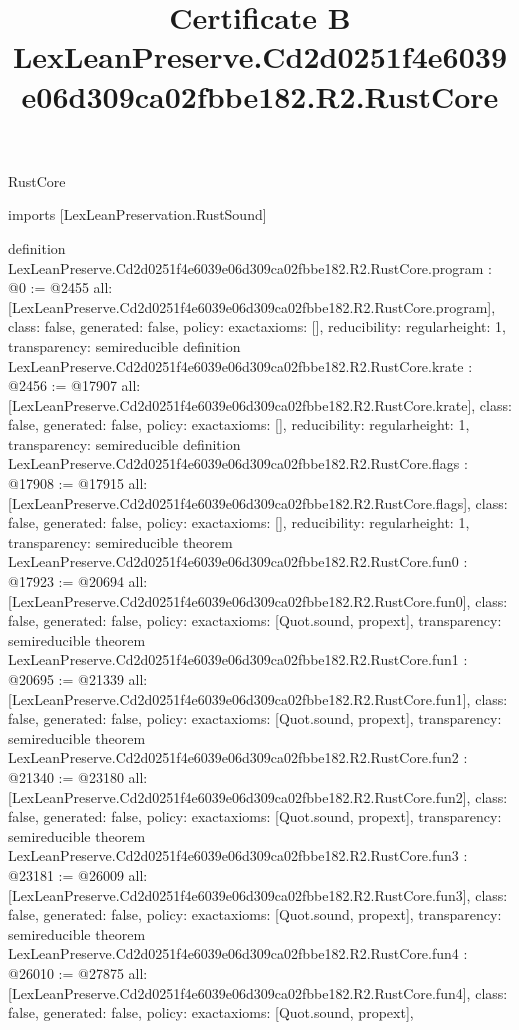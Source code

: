 \begin{lexlean}{RustCore}
\title{Certificate B LexLeanPreserve.Cd2d0251f4e6039e06d309ca02fbbe182.R2.RustCore}
\begin{coremodule}
imports [LexLeanPreservation.RustSound]

definition LexLeanPreserve.Cd2d0251f4e6039e06d309ca02fbbe182.R2.RustCore.program : @0 := @2455 {
  all: [LexLeanPreserve.Cd2d0251f4e6039e06d309ca02fbbe182.R2.RustCore.program],
  class: false,
  generated: false,
  policy: exact{axioms: []},
  reducibility: regular{height: 1},
  transparency: semireducible
}
definition LexLeanPreserve.Cd2d0251f4e6039e06d309ca02fbbe182.R2.RustCore.krate : @2456 := @17907 {
  all: [LexLeanPreserve.Cd2d0251f4e6039e06d309ca02fbbe182.R2.RustCore.krate],
  class: false,
  generated: false,
  policy: exact{axioms: []},
  reducibility: regular{height: 1},
  transparency: semireducible
}
definition LexLeanPreserve.Cd2d0251f4e6039e06d309ca02fbbe182.R2.RustCore.flags : @17908 := @17915 {
  all: [LexLeanPreserve.Cd2d0251f4e6039e06d309ca02fbbe182.R2.RustCore.flags],
  class: false,
  generated: false,
  policy: exact{axioms: []},
  reducibility: regular{height: 1},
  transparency: semireducible
}
theorem LexLeanPreserve.Cd2d0251f4e6039e06d309ca02fbbe182.R2.RustCore.fun0 : @17923 := @20694 {
  all: [LexLeanPreserve.Cd2d0251f4e6039e06d309ca02fbbe182.R2.RustCore.fun0],
  class: false,
  generated: false,
  policy: exact{axioms: [Quot.sound, propext]},
  transparency: semireducible
}
theorem LexLeanPreserve.Cd2d0251f4e6039e06d309ca02fbbe182.R2.RustCore.fun1 : @20695 := @21339 {
  all: [LexLeanPreserve.Cd2d0251f4e6039e06d309ca02fbbe182.R2.RustCore.fun1],
  class: false,
  generated: false,
  policy: exact{axioms: [Quot.sound, propext]},
  transparency: semireducible
}
theorem LexLeanPreserve.Cd2d0251f4e6039e06d309ca02fbbe182.R2.RustCore.fun2 : @21340 := @23180 {
  all: [LexLeanPreserve.Cd2d0251f4e6039e06d309ca02fbbe182.R2.RustCore.fun2],
  class: false,
  generated: false,
  policy: exact{axioms: [Quot.sound, propext]},
  transparency: semireducible
}
theorem LexLeanPreserve.Cd2d0251f4e6039e06d309ca02fbbe182.R2.RustCore.fun3 : @23181 := @26009 {
  all: [LexLeanPreserve.Cd2d0251f4e6039e06d309ca02fbbe182.R2.RustCore.fun3],
  class: false,
  generated: false,
  policy: exact{axioms: [Quot.sound, propext]},
  transparency: semireducible
}
theorem LexLeanPreserve.Cd2d0251f4e6039e06d309ca02fbbe182.R2.RustCore.fun4 : @26010 := @27875 {
  all: [LexLeanPreserve.Cd2d0251f4e6039e06d309ca02fbbe182.R2.RustCore.fun4],
  class: false,
  generated: false,
  policy: exact{axioms: [Quot.sound, propext]},
}
\end{coremodule}
\end{lexlean}
